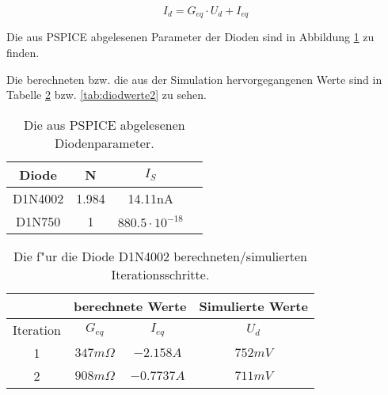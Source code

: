 \begin{equation}
 I_d = G_{eq} \cdot U_d + I_{eq}
\end{equation}

Die aus PSPICE abgelesenen Parameter der Dioden sind in Abbildung \ref{tab:diodparam} zu finden.

Die berechneten bzw. die aus der Simulation hervorgegangenen Werte sind in Tabelle \ref{tab:diodwerte1}
bzw. \ref{tab:diodwerte2} zu sehen.


\begin{table}[!htp]
\begin{center}
\small
\begin{tabular}
{| c | c | c | c|}   %
\hline
Diode & N & $I_S$ \\ \hline
D1N4002 & 1.984 & 14.11nA \\ \hline
D1N750 & 1 & $880.5 \cdot 10^{-18}$ \\ \hline
\end{tabular}
\caption{Die aus PSPICE abgelesenen Diodenparameter.\label{tab:diodparam}}
\end{center}
\end{table}




\begin{table}[!htp]
\begin{center}
\small
\begin{tabular}
{| c || c | c || c|}   %
\hline
 & \multicolumn{2}{|c|}{berechnete Werte} & Simulierte Werte \\ \hline
Iteration & $G_{eq}$ & $I_{eq}$ & $U_d$ \\ \hline
1 & $347m\Omega$ & $-2.158 A$ & $752mV$ \\ \hline
2 & $908m\Omega$ & $-0.7737 A$ & $711mV$ \\ \hline
\end{tabular}
\caption{Die f"ur die Diode D1N4002 berechneten/simulierten Iterationsschritte.\label{tab:diodwerte1}}
\end{center}
\end{table}


